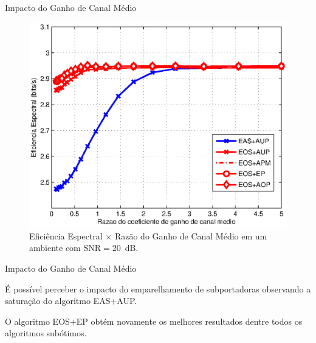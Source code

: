 \begin{frame}{Impacto do Ganho de Canal Médio}
   \begin{figure}[!htb]
     \centering
     \includegraphics[width=0.6\linewidth]{../Imagens/CGxSE-20dB.eps}
     \caption{Eficiência Espectral $\times$ Razão do Ganho de Canal Médio em um ambiente com $\overline{\text{SNR}} = 20$~dB.}\label{fig:CGxSE-20dB}
   \end{figure}   
\end{frame}

\begin{frame}{Impacto do Ganho de Canal Médio}
   \begin{bigitem}
      \item É possível perceber o impacto do emparelhamento de subportadoras observando a saturação do algoritmo EAS+AUP.
      \item O algoritmo EOS+EP obtém novamente os melhores resultados dentre todos os algoritmos subótimos.
   \end{bigitem}
\end{frame}

